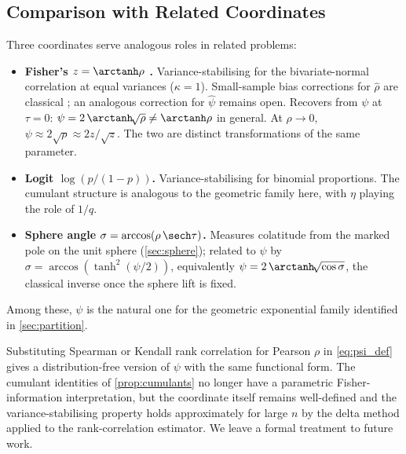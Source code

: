 \subsection{Comparison with Related Coordinates}
\label{sec:psi_comparison}

Three coordinates serve analogous roles in related problems:
\begin{itemize}
  \item \textbf{Fisher's $z = \arctanh\rho$ \parencite{fisher1921}.}  Variance-stabilising for the bivariate-normal correlation at equal variances ($\kappa = 1$).  Small-sample bias corrections for $\hat\rho$ are classical \parencite{olkinPratt1958}; an analogous correction for $\hat\psi$ remains open.  Recovers from $\psi$ at $\tau = 0$: $\psi = 2\,\arctanh\!\sqrt{\rho} \ne \arctanh\rho$ in general.  At $\rho \to 0$, $\psi \approx 2\sqrt{\rho} \approx 2z/\sqrt{z}$.  The two are distinct transformations of the same parameter.
  \item \textbf{Logit $\log(p/(1-p))$.}  Variance-stabilising for binomial proportions.  The cumulant structure is analogous to the geometric family here, with $\eta$ playing the role of $1/q$.
  \item \textbf{Sphere angle $\sigma = \arccos(\rho\,\sech\tau)$.}  Measures colatitude from the marked pole on the unit sphere (\cref{sec:sphere}); related to $\psi$ by $\sigma = \arccos(\tanh^{2}(\psi/2))$, equivalently $\psi = 2\,\arctanh\!\sqrt{\cos\sigma}$, the classical inverse once the sphere lift is fixed.
\end{itemize}
Among these, $\psi$ is the natural one for the geometric exponential family identified in \cref{sec:partition}.

\begin{remark}
Substituting Spearman or Kendall rank correlation for Pearson $\rho$ in \cref{eq:psi_def} gives a distribution-free version of $\psi$ with the same functional form.  The cumulant identities of \cref{prop:cumulants} no longer have a parametric Fisher-information interpretation, but the coordinate itself remains well-defined and the variance-stabilising property holds approximately for large $n$ by the delta method applied to the rank-correlation estimator.  We leave a formal treatment to future work.
\end{remark}
